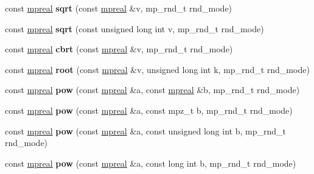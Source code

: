 \begin{DoxyCompactItemize}
\mbox{\label{classmpfr_1_1mpreal_adeb35721ee07dc6d5cb9f7deae802a1d}} 
const \hyperlink{classmpfr_1_1mpreal}{mpreal} {\bfseries sqrt} (const \hyperlink{classmpfr_1_1mpreal}{mpreal} \&v, mp\+\_\+rnd\+\_\+t rnd\+\_\+mode)
\item 
\mbox{\label{classmpfr_1_1mpreal_a1c0dd1c617cc5d6028fa9d6ea3dd1096}} 
const \hyperlink{classmpfr_1_1mpreal}{mpreal} {\bfseries sqrt} (const unsigned long int v, mp\+\_\+rnd\+\_\+t rnd\+\_\+mode)
\item 
\mbox{\label{classmpfr_1_1mpreal_adc44053b22dc29c6fb6ff603a90d0f63}} 
const \hyperlink{classmpfr_1_1mpreal}{mpreal} {\bfseries cbrt} (const \hyperlink{classmpfr_1_1mpreal}{mpreal} \&v, mp\+\_\+rnd\+\_\+t rnd\+\_\+mode)
\item 
\mbox{\label{classmpfr_1_1mpreal_a4d624802e61878531599ef5e111a1f0a}} 
const \hyperlink{classmpfr_1_1mpreal}{mpreal} {\bfseries root} (const \hyperlink{classmpfr_1_1mpreal}{mpreal} \&v, unsigned long int k, mp\+\_\+rnd\+\_\+t rnd\+\_\+mode)
\item 
\mbox{\label{classmpfr_1_1mpreal_a166ef6e3c4f7f9a79c1bcd96f75d56af}} 
const \hyperlink{classmpfr_1_1mpreal}{mpreal} {\bfseries pow} (const \hyperlink{classmpfr_1_1mpreal}{mpreal} \&a, const \hyperlink{classmpfr_1_1mpreal}{mpreal} \&b, mp\+\_\+rnd\+\_\+t rnd\+\_\+mode)
\item 
\mbox{\label{classmpfr_1_1mpreal_a954ad4fba81d78a48f3ec41067f737b0}} 
const \hyperlink{classmpfr_1_1mpreal}{mpreal} {\bfseries pow} (const \hyperlink{classmpfr_1_1mpreal}{mpreal} \&a, const mpz\+\_\+t b, mp\+\_\+rnd\+\_\+t rnd\+\_\+mode)
\item 
\mbox{\label{classmpfr_1_1mpreal_a2dc7712c222b7e255b18add7483d7e8d}} 
const \hyperlink{classmpfr_1_1mpreal}{mpreal} {\bfseries pow} (const \hyperlink{classmpfr_1_1mpreal}{mpreal} \&a, const unsigned long int b, mp\+\_\+rnd\+\_\+t rnd\+\_\+mode)
\item 
\mbox{\label{classmpfr_1_1mpreal_ae6be4eeffa69e1ad6040c1c5179aad7f}} 
const \hyperlink{classmpfr_1_1mpreal}{mpreal} {\bfseries pow} (const \hyperlink{classmpfr_1_1mpreal}{mpreal} \&a, const long int b, mp\+\_\+rnd\+\_\+t rnd\+\_\+mode)

\end{DoxyCompactItemize}
